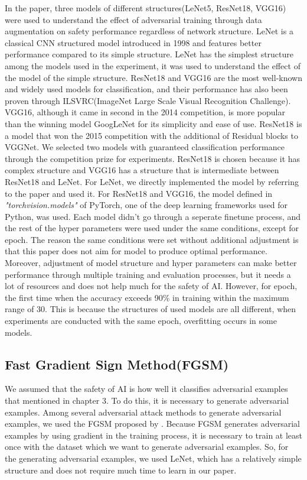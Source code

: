 \documentclass[journal,article,submit,moreauthors,pdftex]{Definitions/mdpi}
\begin{document}
In the paper, three models of different structures(LeNet5, ResNet18, VGG16) were used to understand the effect of adversarial training through data augmentation on safety performance regardless of network structure.
LeNet is a classical CNN  structured model introduced in 1998 and features better performance compared to its simple structure.
LeNet has the simplest structure among the models used in the experiment, it was used to understand the effect of the model of the simple structure.
ResNet18 and VGG16 are the most well-known and widely used models for classification, and their performance has also been proven through ILSVRC(ImageNet Large Scale Visual Recognition Challenge).
VGG16, although it came in second in the 2014 competition, is more popular than the winning model GoogLeNet for its simplicity and ease of use.
ResNet18 is a model that won the 2015 competition with the additional of Residual blocks to VGGNet.
We selected two models with guaranteed classification performance through the competition prize for experiments.
ResNet18 is chosen because it has complex structure and VGG16 has a structure that is intermediate between ResNet18 and LeNet.
For LeNet, we directly implemented the model by referring to the paper and used it.
For ResNet18 and VGG16, the model defined in {\it "torchvision.models"} of PyTorch\cite{pytorch}, one of the deep learning frameworks used for Python, was used.
Each model didn't go through a seperate finetune process, and the rest of the hyper parameters were used under the same conditions, except for epoch.
The reason the same conditions were set without additional adjustment is that this paper does not aim for model to produce optimal performance.
Moreover, adjustment of model structure and hyper parameters can make better performance through multiple training and evaluation processes, but it needs a lot of resources and does not help much for the safety of AI.
However, for epoch, the first time when the accuracy exceeds 90\% in training within the maximum range of 30. This is because the structures of used models are all different, when experiments are conducted with the same epoch, overfitting occurs in some models.

\subsection{Fast Gradient Sign Method(FGSM)}

We assumed that the safety of AI is how well it classifies adversarial examples that mentioned in chapter 3.
To do this, it is necessary to generate adversarial examples. Among several adversarial attack methods to generate adversarial examples, we used the FGSM proposed by \cite{adversarial-goodfellow}.
Because FGSM generates adversarial examples by using gradient in the training process, it is necessary to train at least once with the dataset which we want to generate adversarial examples.
So, for the generating adversarial examples, we used LeNet, which has a relatively simple structure and does not require much time to learn in our paper.
\end{document}
